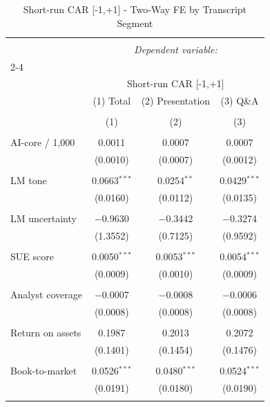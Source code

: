 
\begin{table}[!htbp] \centering 
  \caption{Short-run CAR [-1,+1] - Two-Way FE by Transcript Segment} 
  \label{} 
\begin{tabular}{@{\extracolsep{5pt}}lccc} 
\\[-1.8ex]\hline 
\hline \\[-1.8ex] 
 & \multicolumn{3}{c}{\textit{Dependent variable:}} \\ 
\cline{2-4} 
\\[-1.8ex] & \multicolumn{3}{c}{Short-run CAR [-1,+1]} \\ 
 & (1) Total & (2) Presentation & (3) Q\&A \\ 
\\[-1.8ex] & (1) & (2) & (3)\\ 
\hline \\[-1.8ex] 
 AI-core / 1,000 & 0.0011 & 0.0007 & 0.0007 \\ 
  & (0.0010) & (0.0007) & (0.0012) \\ 
  & & & \\ 
 LM tone & 0.0663$^{***}$ & 0.0254$^{**}$ & 0.0429$^{***}$ \\ 
  & (0.0160) & (0.0112) & (0.0135) \\ 
  & & & \\ 
 LM uncertainty & $-$0.9630 & $-$0.3442 & $-$0.3274 \\ 
  & (1.3552) & (0.7125) & (0.9592) \\ 
  & & & \\ 
 SUE score & 0.0050$^{***}$ & 0.0053$^{***}$ & 0.0054$^{***}$ \\ 
  & (0.0009) & (0.0010) & (0.0009) \\ 
  & & & \\ 
 Analyst coverage & $-$0.0007 & $-$0.0008 & $-$0.0006 \\ 
  & (0.0008) & (0.0008) & (0.0008) \\ 
  & & & \\ 
 Return on assets & 0.1987 & 0.2013 & 0.2072 \\ 
  & (0.1401) & (0.1454) & (0.1476) \\ 
  & & & \\ 
 Book-to-market & 0.0526$^{***}$ & 0.0480$^{***}$ & 0.0524$^{***}$ \\ 
  & (0.0191) & (0.0180) & (0.0190) \\ 
  & & & \\ 

\end{tabular}
\end{table}
